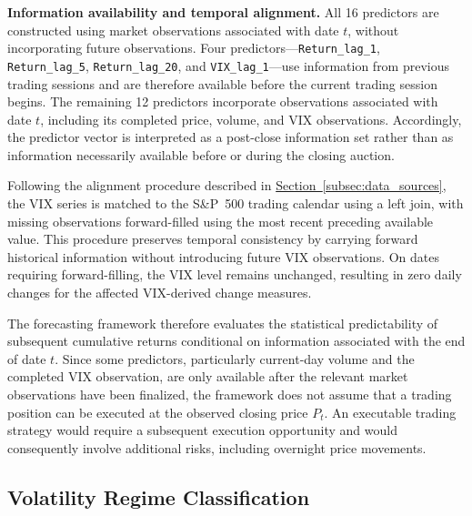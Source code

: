 \documentclass[12pt,twoside]{ord}
\begin{document}
\noindent\textbf{Information availability and temporal alignment.} All 16 predictors are constructed using market observations associated with date $t$, without incorporating future observations. Four predictors---\texttt{Return\_lag\_1}, \texttt{Return\_lag\_5}, \texttt{Return\_lag\_20}, and \texttt{VIX\_lag\_1}---use information from previous trading sessions and are therefore available before the current trading session begins. The remaining 12 predictors incorporate observations associated with date $t$, including its completed price, volume, and VIX observations. Accordingly, the predictor vector is interpreted as a post-close information set rather than as information necessarily available before or during the closing auction.

Following the alignment procedure described in \hyperref[subsec:data_sources]{Section~\ref*{subsec:data_sources}}, the VIX series is matched to the S\&P~500 trading calendar using a left join, with missing observations forward-filled using the most recent preceding available value. This procedure preserves temporal consistency by carrying forward historical information without introducing future VIX observations. On dates requiring forward-filling, the VIX level remains unchanged, resulting in zero daily changes for the affected VIX-derived change measures.

The forecasting framework therefore evaluates the statistical predictability of subsequent cumulative returns conditional on information associated with the end of date $t$. Since some predictors, particularly current-day volume and the completed VIX observation, are only available after the relevant market observations have been finalized, the framework does not assume that a trading position can be executed at the observed closing price $P_t$. An executable trading strategy would require a subsequent execution opportunity and would consequently involve additional risks, including overnight price movements.

\subsection{Volatility Regime Classification}\label{subsec:regime_classification}
\end{document}
